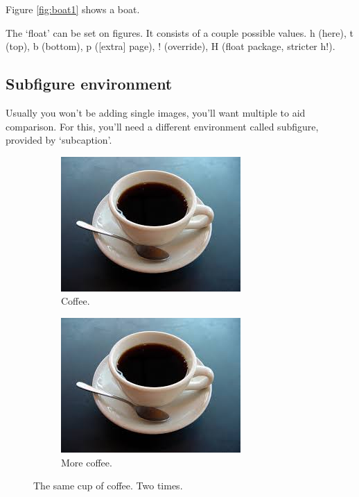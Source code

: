 \documentclass{article}
\begin{document}
Figure \ref{fig:boat1} shows a boat.

The `float' can be set on figures. It consists of a couple possible values.
h (here), t (top), b (bottom), p ([extra] page), ! (override), H (float package, stricter h!).

\subsection{Subfigure environment}

Usually you won't be adding single images, you'll want multiple to aid comparison.
For this, you'll need a different environment called subfigure, provided by `subcaption'.

\begin{figure}[h!]
  \centering
  \begin{subfigure}[b]{0.4\linewidth}
    \includegraphics[width=\linewidth]{coffee.jpg}
    \caption{Coffee.}
  \end{subfigure}
  \begin{subfigure}[b]{0.4\linewidth}
    \includegraphics[width=\linewidth]{coffee.jpg}
    \caption{More coffee.}
  \end{subfigure}
  \caption{The same cup of coffee. Two times.}
  \label{fig:coffee}
\end{figure}
\end{document}

